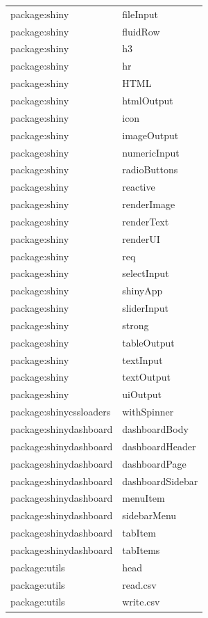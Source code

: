 \documentclass[]{article}
\begin{document}
\begin{longtable}{ll}
package:shiny & fileInput\\
\rowcolor{gray!6} package:shiny & fluidRow\\
package:shiny & h3\\
\rowcolor{gray!6} package:shiny & hr\\
package:shiny & HTML\\
\rowcolor{gray!6} package:shiny & htmlOutput\\
package:shiny & icon\\
\rowcolor{gray!6} package:shiny & imageOutput\\
package:shiny & numericInput\\
\rowcolor{gray!6} package:shiny & radioButtons\\
package:shiny & reactive\\
\rowcolor{gray!6} package:shiny & renderImage\\
package:shiny & renderText\\
\rowcolor{gray!6} package:shiny & renderUI\\
package:shiny & req\\
\rowcolor{gray!6} package:shiny & selectInput\\
package:shiny & shinyApp\\
\rowcolor{gray!6} package:shiny & sliderInput\\
package:shiny & strong\\
\rowcolor{gray!6} package:shiny & tableOutput\\
package:shiny & textInput\\
\rowcolor{gray!6} package:shiny & textOutput\\
package:shiny & uiOutput\\
\rowcolor{gray!6} package:shinycssloaders & withSpinner\\
package:shinydashboard & dashboardBody\\
\rowcolor{gray!6} package:shinydashboard & dashboardHeader\\
package:shinydashboard & dashboardPage\\
\rowcolor{gray!6} package:shinydashboard & dashboardSidebar\\
package:shinydashboard & menuItem\\
\rowcolor{gray!6} package:shinydashboard & sidebarMenu\\
package:shinydashboard & tabItem\\
\rowcolor{gray!6} package:shinydashboard & tabItems\\
package:utils & head\\
\rowcolor{gray!6} package:utils & read.csv\\
package:utils & write.csv\\
\bottomrule
\end{longtable}
\endgroup{}
\end{document}
